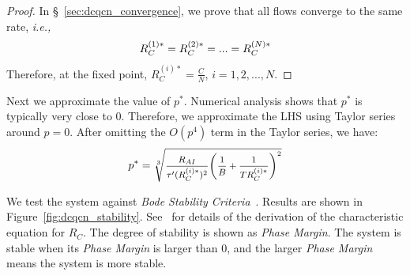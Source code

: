 \begin{proof}
In \S~\ref{sec:dcqcn_convergence}, we prove that all flows converge to the same rate, {\em i.e.,}
\begin{equation}
\small
R_C^{(1)*} = R_C^{(2)*} = ... = R_C^{(N)*}
\end{equation}
Therefore, at the fixed point, $R_C^{(i)*} = \frac{C}{N}$, $i = 1, 2, ..., N$.
\end{proof}

Next we approximate the value of $p^*$. Numerical analysis shows that $p^*$ is 
typically very close to 0. Therefore, we approximate the LHS using Taylor series around $p=0$.
After omitting the $O(p^4)$ term in the Taylor series, we have:
\begin{equation}
\small
{p^*} = \sqrt[3]{{\frac{{{R_{AI}}}}{{{\tau '}(R_C^{(i)*})^2}}{{\left( {\frac{1}{B} + \frac{1}{TR_C^{(i)*}}} \right)}^2}}}
\label{eq:fixedp}
\end{equation}




We test the system against {\em Bode Stability Criteria}~\cite{controltheory}. 
Results are shown in Figure~\ref{fig:dcqcn_stability}. See~\cite{fullpaper} for
details of the derivation of the characteristic equation for $R_C$.
The degree of stability is shown as {\em
Phase Margin}. The system is stable when its {\em Phase Margin} is larger than
0, and the larger {\em Phase Margin} means the system is more stable.

